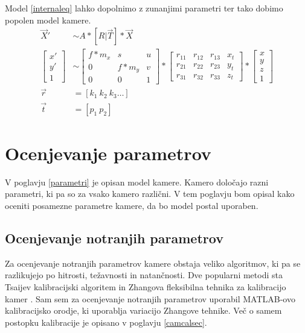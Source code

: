 \documentclass[a4paper, 12pt]{book}
\begin{document}
Model \eqref{internaleq} lahko dopolnimo z zunanjimi parametri ter tako dobimo popolen model kamere.
\begin{align}
\label{totalmodel}
\vec{X}' &\sim A * [R | \vec{T}] * \vec{X} \\
\begin{bmatrix}
x' \\
y' \\
1
\end{bmatrix}
&\sim
\begin{bmatrix}
f*m_x & s & u \\
0 & f*m_y & v \\
0 & 0 & 1
\end{bmatrix}
*
\begin{bmatrix}
r_{11} & r_{12} & r_{13} & x_t\\
r_{21} & r_{22} & r_{23} & y_t\\
r_{31} & r_{32} & r_{33} & z_t
\end{bmatrix}
*
\begin{bmatrix}
x \\
y \\
z \\
1
\end{bmatrix} \\
\vec{r} &= [k_1 \ k_2 \ k_3 \dots] \\
\vec{t} &= [p_1 \ p_2]
\end{align}

\section{Ocenjevanje parametrov}
V poglavju \ref{parametri} je opisan model kamere. Kamero določajo razni parametri, ki pa so za vsako kamero različni. V tem poglavju bom opisal kako oceniti posamezne parametre kamere, da bo model postal uporaben.

\subsection{Ocenjevanje notranjih parametrov}
Za ocenjevanje notranjih parametrov kamere obstaja veliko algoritmov, ki pa se razlikujejo po hitrosti, težavnosti in natančnosti. Dve popularni metodi sta Tsaijev kalibracijski algoritem \cite{horn2000tsai} in Zhangova fleksibilna tehnika za kalibracijo kamer \cite{zhang2000flexible}. Sam sem za ocenjevanje notranjih parametrov uporabil MATLAB-ovo kalibracijsko orodje, ki uporablja variacijo Zhangove tehnike. Več o samem postopku kalibracije je opisano v poglavju \ref{camcalsec}. 
\end{document}
